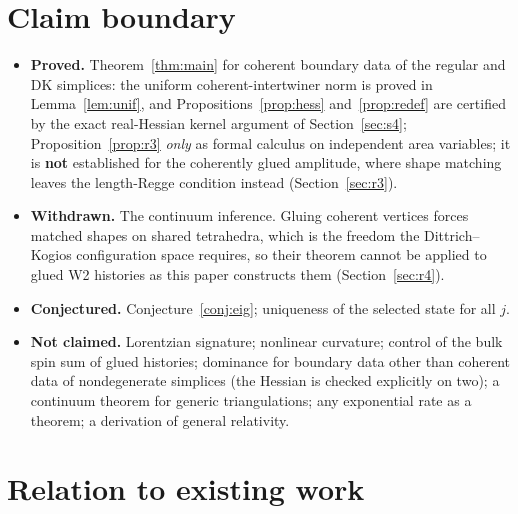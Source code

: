 \documentclass[11pt]{article}
\numberwithin{equation}{section}
\theoremstyle{definition}
\theoremstyle{remark}
\begin{document}
\section{Claim boundary}\label{sec:claims}

\begin{itemize}
\item \textbf{Proved.} Theorem~\ref{thm:main} for coherent boundary data of the
regular and DK simplices: the uniform coherent-intertwiner norm is proved in
Lemma~\ref{lem:unif}, and Propositions~\ref{prop:hess} and~\ref{prop:redef}
are certified by the exact real-Hessian kernel argument of
Section~\ref{sec:s4};
Proposition~\ref{prop:r3} \emph{only} as formal calculus on independent area
variables; it is \textbf{not} established for the coherently glued amplitude,
where shape matching leaves the length-Regge condition instead
(Section~\ref{sec:r3}).
\item \textbf{Withdrawn.} The continuum inference. Gluing coherent vertices
forces matched shapes on shared tetrahedra, which is the freedom the
Dittrich--Kogios configuration space requires, so their theorem cannot be applied
to glued W2 histories as this paper constructs them (Section~\ref{sec:r4}).
\item \textbf{Conjectured.} Conjecture~\ref{conj:eig}; uniqueness of the selected
state for all $j$.
\item \textbf{Not claimed.} Lorentzian signature; nonlinear curvature; control of
the bulk spin sum of glued histories; dominance for boundary data other than
coherent data of nondegenerate simplices (the Hessian is checked explicitly on
two); a continuum theorem for generic triangulations; any exponential rate as a
theorem; a derivation of general relativity.
\end{itemize}

\section{Relation to existing work}\label{sec:related}
\end{document}
